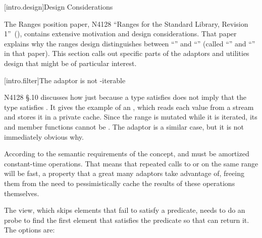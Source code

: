 [intro.design]{Design Considerations}

\pnum
The Ranges position paper, N4128 ``Ranges for the Standard Library,
Revision 1''~(\cite{N4128}), contains extensive motivation and design
considerations. That paper explains why the ranges design distinguishes between
``'' and ``'' (called ``'' and
``'' in that paper). This section calls out specific parts of the
adaptors and utilities design that might be of particular interest. 

[intro.filter]{The  adaptor is not -iterable}

\pnum
N4128 \S{}.10 discusses how just because a type  satisfies  does
not imply that the type  satisfies . It gives the
example of an , which reads each value from a stream and
stores it in a private cache. Since the range is mutated while it is iterated,
its  and  member functions cannot be . The
 adaptor is a similar case, but it is not immediately obvious why.

\pnum
According to the semantic requirements of the  concept, 
and  must be amortized constant-time operations. That means that
repeated calls to  or  on the same range will be fast,
a property that a great many adaptors take advantage of, freeing them from the
need to pessimistically cache the results of these operations themselves.

\pnum
The  view, which skips elements that fail to satisfy a predicate,
needs to do an  probe to find the first element that satisfies the
predicate so that  can return it. The options are:


